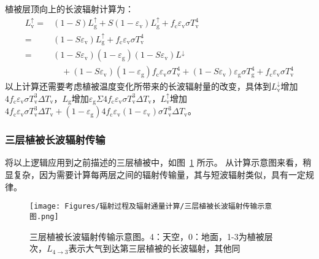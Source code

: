 植被层顶向上的长波辐射计算为：
\begin{equation}
  \begin{aligned} L_{\mathrm {v}} ^\uparrow=&(1-S) L_{\mathrm{g}} ^\uparrow+S\left(1-\varepsilon_{\mathrm{v}}\right) L_{\mathrm{g}}
    ^\uparrow+f_{\mathrm{c}} \varepsilon_{\mathrm{v}} \sigma T_{\mathrm{v}}^{4} \\=&\left(1-S \varepsilon_{\mathrm{v}}\right) L_{\mathrm{g}}
    ^\uparrow+f_{\mathrm{c}} \varepsilon_{\mathrm{v}} \sigma T_{\mathrm{v}}^{4} \\=&\left(1-S \varepsilon_{\mathrm{v}}\right)\left(1-\varepsilon_{\mathrm{g}}\right)\left(1-S \varepsilon_{\mathrm{v}}\right) L^\downarrow \\
    & \quad +\left(1-S \varepsilon_{\mathrm{v}}\right)\left(1-\varepsilon_{\mathrm{g}}\right) f_{\mathrm{c}} \varepsilon_{\mathrm{v}} \sigma T_{\mathrm{v}}^{4}+\left(1-S \varepsilon_{\mathrm{v}}\right)
  \varepsilon_{\mathrm{g}} \sigma T_{\mathrm{g}}^{4}+f_{\mathrm{c}} \varepsilon_{\mathrm{v}} \sigma T_{\mathrm{v}}^{4} \end{aligned}
\end{equation}
以上计算还需要考虑植被温度变化所带来的长波辐射量的改变，具体到$L_{\mathrm {v}}^\downarrow$增加$4f_{\mathrm {c}}\varepsilon_{\mathrm {v}}\sigma T_{\mathrm {v}}^3\Delta T_{\mathrm {v}}$，${L_{\mathrm{g}}}$增加$\varepsilon_{\mathrm{g}} \Sigma 4 f_{\mathrm{c}} \varepsilon_{\mathrm{v}} \sigma T_{\mathrm{v}}^{3} \Delta T_{\mathrm{v}}$，$L_{\mathrm {v}} ^\uparrow$增加$4 f_{\mathrm{c}} \varepsilon_{\mathrm{v}} \sigma T_{\mathrm{v}}^{3} \Delta T_{\mathrm{v}}+(1-\varepsilon_{\mathrm{g}}) 4 f_{\mathrm{c}}
\varepsilon_{\mathrm{v}}(1-\varepsilon_{\mathrm{v}}) \sigma T_{\mathrm{v}}^{3} \Delta T_{\mathrm{v}}$。

\subsubsection{三层植被长波辐射传输}

将以上逻辑应用到之前描述的三层植被中，如图~\ref{fig:三层植被长波辐射传输示意图} 所示。
从计算示意图来看，稍显复杂，因为需要计算每两层之间的辐射传输量，其与短波辐射类似，具有一定规律。
%
{
  \begin{figure}[htbp]
    \centering
    \texttt{[image: Figures/辐射过程及辐射通量计算/三层植被长波辐射传输示意图.png]}
    \caption[三层植被长波辐射传输示意图]{三层植被长波辐射传输示意图。4：天空，0：地面，1-3为植被层次，$L_{4 \rightarrow 3}$表示大气到达第三层植被的长波辐射，其他同}
    \label{fig:三层植被长波辐射传输示意图}
  \end{figure}
}
%

